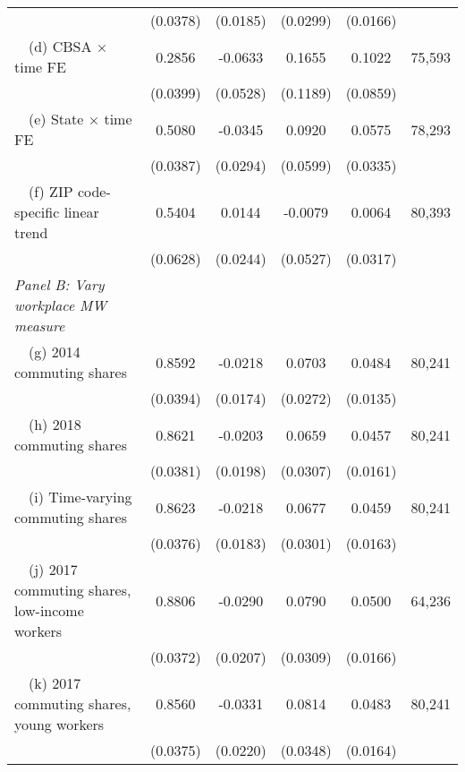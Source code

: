 \begin{landscape}
\begin{table}[ht!]
\begin{tabular}{@{}lccccc@{}}
                                                             & (0.0378) & (0.0185) & (0.0299) & (0.0166) &      \\
        $\quad$(d) CBSA $\times$ time FE                     &  0.2856  &  -0.0633  &  0.1655  &  0.1022  & 75,593 \\
                                                             & (0.0399) & (0.0528) & (0.1189) & (0.0859) &      \\
        $\quad$(e) State $\times$ time FE                    &  0.5080  &  -0.0345  &  0.0920  &  0.0575  & 78,293 \\
                                                             & (0.0387) & (0.0294) & (0.0599) & (0.0335) &      \\
        $\quad$(f) ZIP code-specific linear trend            &  0.5404  &  0.0144  &  -0.0079  &  0.0064  & 80,393 \\
                                                             & (0.0628) & (0.0244) & (0.0527) & (0.0317) &      \\
        \textit{Panel B: Vary workplace MW measure}          &       &       &       &       &      \\
        $\quad$(g) 2014 commuting shares                     &  0.8592  &  -0.0218  &  0.0703  &  0.0484  & 80,241 \\
                                                             & (0.0394) & (0.0174) & (0.0272) & (0.0135) &      \\
        $\quad$(h) 2018 commuting shares                     &  0.8621  &  -0.0203  &  0.0659  &  0.0457  & 80,241 \\
                                                             & (0.0381) & (0.0198) & (0.0307) & (0.0161) &      \\
        $\quad$(i) Time-varying commuting shares             &  0.8623  &  -0.0218  &  0.0677  &  0.0459  & 80,241 \\
                                                             & (0.0376) & (0.0183) & (0.0301) & (0.0163) &      \\
        $\quad$(j) 2017 commuting shares, low-income workers &  0.8806  &  -0.0290  &  0.0790  &  0.0500  & 64,236 \\
                                                             & (0.0372) & (0.0207) & (0.0309) & (0.0166) &      \\
        $\quad$(k) 2017 commuting shares, young workers      &  0.8560  &  -0.0331  &  0.0814  &  0.0483  & 80,241 \\
                                                             & (0.0375) & (0.0220) & (0.0348) & (0.0164) &      \\ \bottomrule
    \end{tabular}


\end{table}
\end{landscape}
